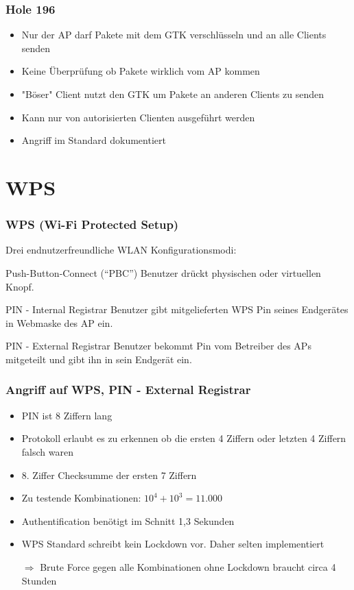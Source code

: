 \documentclass{beamer}
\begin{document}
\begin{frame}
\frametitle{Hole 196 \cite{hole196}}
\begin{itemize}
	\item Nur der AP darf Pakete mit dem GTK verschlüsseln und an alle Clients senden
	\item Keine Überprüfung ob Pakete wirklich vom AP kommen
    \item "Böser" Client nutzt den GTK um Pakete an anderen Clients zu senden
	\item Kann nur von autorisierten Clienten ausgeführt werden
	\item Angriff im Standard dokumentiert
\end{itemize}
\end{frame}

\section{WPS}

\begin{frame}
\frametitle{WPS (Wi-Fi Protected Setup)}
Drei endnutzerfreundliche WLAN Konfigurationsmodi:
\begin{block}{Push-Button-Connect (“PBC”)}
Benutzer drückt physischen oder virtuellen Knopf.
\end{block}
\begin{block}{PIN - Internal Registrar}
Benutzer gibt mitgelieferten WPS Pin seines Endgerätes in Webmaske des AP ein.
\end{block}
\begin{block}{PIN - External Registrar}
Benutzer bekommt Pin vom Betreiber des APs mitgeteilt und gibt ihn in sein Endgerät ein.
\end{block}
\end{frame}


\begin{frame}
\frametitle{Angriff auf WPS, PIN - External Registrar \cite{wps_attack}}
\begin{itemize}
	\item PIN ist 8 Ziffern lang
	\item Protokoll erlaubt es zu erkennen ob die ersten 4 Ziffern oder letzten 4 Ziffern falsch waren
	\item 8. Ziffer Checksumme der ersten 7 Ziffern
	\item Zu testende Kombinationen: $10^4+10^3 = 11.000$
	\item Authentification benötigt im Schnitt 1,3 Sekunden
	\item WPS Standard schreibt kein Lockdown vor. Daher selten implementiert
	\item[$\Rightarrow$] Brute Force gegen alle Kombinationen ohne Lockdown braucht circa 4 Stunden
\end{itemize}
\end{frame}
\end{document}

